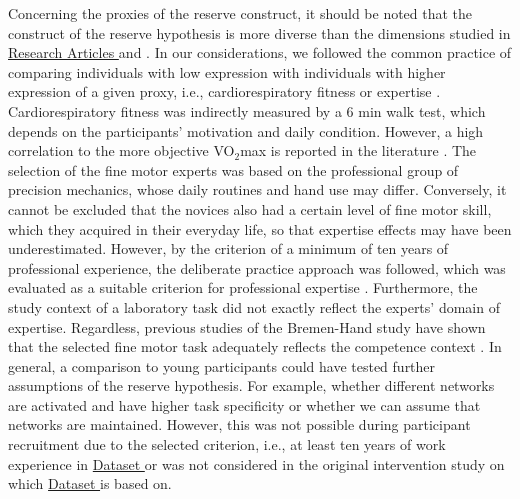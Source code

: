 Concerning the proxies of the reserve construct, it should be noted that the construct of the reserve hypothesis is more diverse than the dimensions studied in \hyperref[results:paperI]{Research Articles } and \hyperref[results:paperI]{}. In our considerations, we followed the common practice of comparing individuals with low expression with individuals with higher expression of a given proxy, i.e., cardiorespiratory fitness or expertise \cite{Koen2019}. Cardiorespiratory fitness was indirectly measured by a 6 min walk test, which depends on the participants' motivation and daily condition. However, a high correlation to the more objective VO$_2$max is reported in the literature \cite{Zhang2017}. The selection of the fine motor experts was based on the professional group of precision mechanics, whose daily routines and hand use may differ. Conversely, it cannot be excluded that the novices also had a certain level of fine motor skill, which they acquired in their everyday life, so that expertise effects may have been underestimated. However, by the criterion of a minimum of ten years of professional experience, the deliberate practice approach was followed, which was evaluated as a suitable criterion for professional expertise \cite{Ericsson1991, Voelcker-Rehage2013}. Furthermore, the study context of a laboratory task did not exactly reflect the experts' domain of expertise. Regardless, previous studies of the Bremen-Hand study have shown that the selected fine motor task adequately reflects the competence context \cite{Vieluf2018, Goelz2018, Vieluf2012, Vieluf2013}. In general, a comparison to young participants could have tested further assumptions of the reserve hypothesis. For example, whether different networks are activated and have higher task specificity or whether we can assume that networks are maintained. However, this was not possible during participant recruitment due to the selected criterion, i.e., at least ten years of work experience in \hyperref[methods:datasets:I]{Dataset } or was not considered in the original intervention study on which \hyperref[methods:datasets:III]{Dataset } is based on.\\
